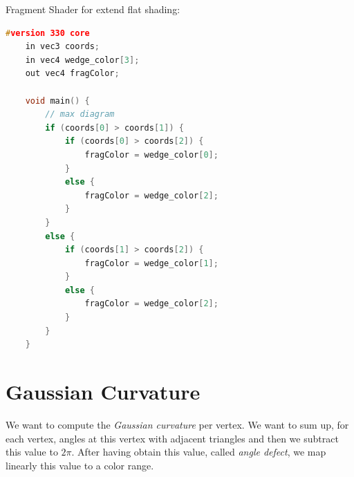 Fragment Shader for extend flat shading:
\begin{lstlisting}[language=C++,
    directivestyle={\color{black}}
    emph={int,char,double,float,unsigned},
    emphstyle={\color{blue}}
   ]
    #version 330 core
    in vec3 coords;
    in vec4 wedge_color[3];
    out vec4 fragColor;

    void main() {
        // max diagram
        if (coords[0] > coords[1]) {
            if (coords[0] > coords[2]) {
                fragColor = wedge_color[0];
            }
            else {
                fragColor = wedge_color[2];
            }
        }
        else {
            if (coords[1] > coords[2]) {
                fragColor = wedge_color[1];
            }
            else {
                fragColor = wedge_color[2];
            }
        }
    }
\end{lstlisting}

\section{Gaussian Curvature}
We want to compute the \textit{Gaussian curvature} per vertex. We want to sum up, for each vertex, angles at this vertex with adjacent triangles and then we subtract this value to $2\pi$.
After having obtain this value, called \textit{angle defect}, we map linearly this value to a color range.

